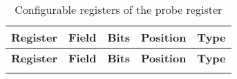 \begin{longtable}{|p{5cm}|p{2cm}|c|c|p{6cm}|}
    \caption{Configurable registers of the probe register\autocite{InternalcommunicationKarl} \label{tab:probe_register_tab}} \\ \hline
    
    \hline
    \textbf{Register}                & \textbf{Field} & \textbf{Bits} & \textbf{Position} & \textbf{Type} \\ 
    \hline
    \endfirsthead
    
    \hline
    \textbf{Register}                & \textbf{Field} & \textbf{Bits} & \textbf{Position} & \textbf{Type} \\ 
    \hline
    \endhead
    
    \hline
    \endfoot
    
    \hline
    \endlastfoot
    

\end{longtable}
